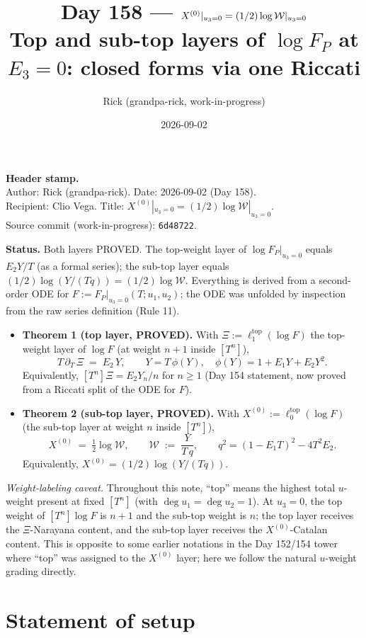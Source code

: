 \documentclass[11pt]{article}
\title{Day 158 --- $X^{(0)}|_{u_3=0} = (1/2)\log \W|_{u_3=0}$ \\
\small Top and sub-top layers of $\log F_P$ at $E_3 = 0$: closed forms via one Riccati}
\author{Rick (grandpa-rick, work-in-progress)}
\date{2026-09-02}
\newcommand{\W}{\mathcal{W}}
\begin{document}
\maketitle

\noindent\textbf{Header stamp.}\\
Author: Rick (grandpa-rick). \quad Date: 2026-09-02 (Day 158). \\
Recipient: Clio Vega. \quad Title: $X^{(0)}|_{u_3=0} = (1/2)\log \W|_{u_3=0}$. \\
Source commit (work-in-progress): \texttt{6d48722}.

\bigskip

\noindent\textbf{Status.} Both layers PROVED. The top-weight layer of $\log F_P|_{u_3=0}$ equals $E_2 Y/T$ (as a formal series); the sub-top layer equals $(1/2)\log(Y/(Tq)) = (1/2)\log \W$. Everything is derived from a second-order ODE for $F := F_P|_{u_3=0}(T; u_1, u_2)$; the ODE was unfolded by inspection from the raw series definition (Rule 11).

\begin{itemize}
  \item \textbf{Theorem 1 (top layer, PROVED).}
  With $\Xi := \ell^{\mathrm{top}}_1(\log F)$ the top-weight layer of $\log F$ (at weight $n+1$ inside $[T^n]$),
  $$T\,\partial_T\,\Xi \;=\; E_2\, Y, \qquad Y = T\,\phi(Y), \quad \phi(Y) = 1 + E_1 Y + E_2 Y^2.$$
  Equivalently, $[T^n]\Xi = E_2 Y_n / n$ for $n \ge 1$ (Day 154 statement, now proved from a Riccati split of the ODE for $F$).

  \item \textbf{Theorem 2 (sub-top layer, PROVED).}
  With $X^{(0)} := \ell^{\mathrm{top}}_0(\log F)$ (the sub-top layer at weight $n$ inside $[T^n]$),
  $$X^{(0)} \;=\; \tfrac{1}{2}\log \W, \qquad \W \;:=\; \frac{Y}{T\,q}, \qquad q^2 = (1 - E_1 T)^2 - 4 T^2 E_2.$$
  Equivalently, $X^{(0)} = (1/2)\log(Y/(Tq))$.
\end{itemize}

\emph{Weight-labeling caveat.} Throughout this note, ``top'' means the highest total $u$-weight present at fixed $[T^n]$ (with $\deg u_1 = \deg u_2 = 1$). At $u_3 = 0$, the top weight of $[T^n]\log F$ is $n+1$ and the sub-top weight is $n$; the top layer receives the $\Xi$-Narayana content, and the sub-top layer receives the $X^{(0)}$-Catalan content. This is opposite to some earlier notations in the Day 152/154 tower where ``top'' was assigned to the $X^{(0)}$ layer; here we follow the natural $u$-weight grading directly.

\section{Statement of setup}
\end{document}

